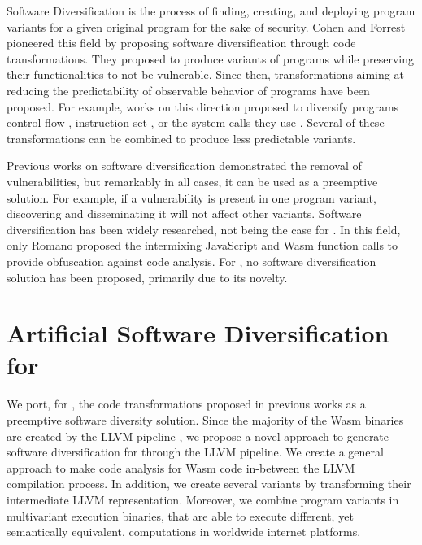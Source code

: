 Software Diversification is the process of finding, creating, and deploying program variants for a given original program \cite{okhravi2013survey} for the sake of security.
Cohen \etal \cite{cohen1993operating} and Forrest \etal \cite{595185} pioneered this field by proposing software diversification through code transformations. 
They proposed to produce variants of programs while preserving their functionalities to not be vulnerable.
Since then, transformations aiming at reducing the predictability of observable behavior of programs have been proposed. For example, works on this direction proposed to diversify programs control flow \cite{davi2015isomeron}, instruction set \cite{barrantes2003randomized}, or the system calls they use \cite{Chew02mitigatingbuffer}. 
Several of these transformations can be combined to produce less predictable variants.

Previous works on software diversification demonstrated the removal of vulnerabilities, but remarkably in all cases, it can be used as a preemptive solution.
For example, if a vulnerability is present in one program variant, discovering and disseminating it will not affect other variants.
Software diversification has been widely researched, not being the case for \wasm.
In this field, only Romano \etal \cite{wobfuscator} proposed the intermixing JavaScript and Wasm function calls to provide obfuscation against code analysis. 
For \wasm, no software diversification solution has been proposed, primarily due to its novelty.






\section{Artificial Software Diversification for \wasm}


We port, for \wasm, the code transformations proposed in previous works as a preemptive software diversity solution.
Since the majority of the Wasm binaries are created by the LLVM pipeline \cite{Hilbig2021AnES}, we propose a novel approach to generate software diversification for \wasm through the LLVM pipeline.
We create a general approach to make code analysis for Wasm code in-between the LLVM compilation process.
In addition, we create several \wasm variants by transforming their intermediate LLVM representation.
Moreover, we combine \wasm program variants in multivariant execution binaries, that are able to execute different, yet semantically equivalent, computations in worldwide internet platforms.


